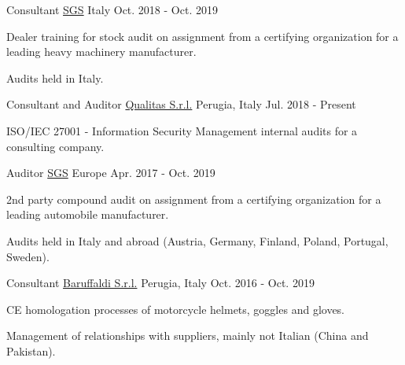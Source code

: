 \begin{cventries}
\cventry
{Consultant}
{\href{https://sgs.com}{SGS}}
{Italy}
{Oct. 2018 - Oct. 2019}
{\begin{cvitems}
\item {Dealer training for stock audit on assignment from a certifying organization for a leading heavy machinery manufacturer.}
\item {Audits held in Italy.}
\end{cvitems}}

\cventry
{Consultant and Auditor}
{\href{https://www.qualitas.eu}{Qualitas S.r.l.}}
{Perugia, Italy}
{Jul. 2018 - Present}
{\begin{cvitems}
\item {ISO/IEC 27001 - Information Security Management internal audits for a consulting company.}
\end{cvitems}}

\cventry
{Auditor}
{\href{https://sgs.com}{SGS}}
{Europe}
{Apr. 2017 - Oct. 2019}
{\begin{cvitems}
\item {2nd party compound audit on assignment from a certifying organization for a leading automobile manufacturer.}
\item {Audits held in Italy and abroad (Austria, Germany, Finland, Poland, Portugal, Sweden).}
\end{cvitems}}

\cventry
{Consultant}
{\href{https://www.baruffaldi.net/}{Baruffaldi S.r.l.}}
{Perugia, Italy}
{Oct. 2016 - Oct. 2019}
{\begin{cvitems}
\item {CE homologation processes of motorcycle helmets, goggles and gloves.}
\item {Management of relationships with suppliers, mainly not Italian (China and Pakistan).}
\end{cvitems}}

\end{cventries}